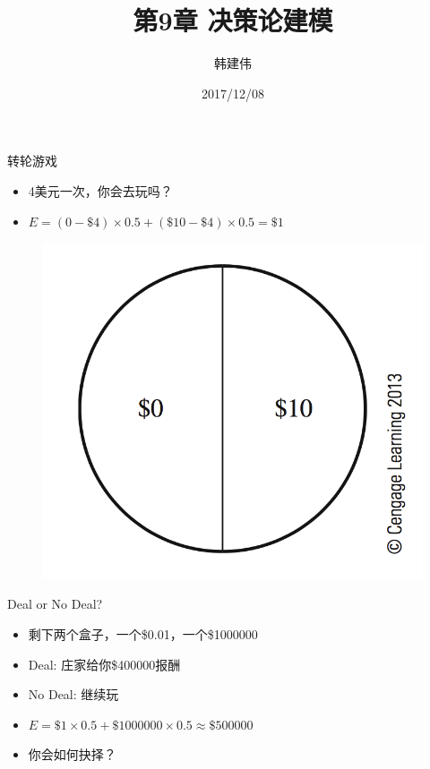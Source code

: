 \documentclass[UTF8]{ctexbeamer}
\title{第9章 决策论建模}
\author{韩建伟}
\institute{
  信息学院\\
  \texttt{mm@hanjianwei.com}
}
\date{2017/12/08}
\begin{document}
\begin{frame}[plain]
  \titlepage{}
\end{frame}

\begin{frame}{转轮游戏}

  \begin{itemize}
  \item<1-> 4美元一次，你会去玩吗？
  \item<2-> $E = (0-\$4) \times 0.5 + (\$10 - \$4) \times 0.5 = \$1$
  \end{itemize}

  \begin{figure}
    \centering
    \includegraphics[height=.4\textheight{}]{9_1.png}
  \end{figure}
  
\end{frame}

\begin{frame}{Deal or No Deal?}

  \begin{itemize}
  \item<1-> 剩下两个盒子，一个\$0.01，一个\$1000000
  \item<1-> Deal: 庄家给你\$400000报酬
  \item<1-> No Deal: 继续玩
  \item<2-> $E = \$1 \times 0.5 + \$1000000 \times 0.5 \approx \$500000$
  \item<3-> 你会如何抉择？
  \end{itemize}
  
\end{frame}
\end{document}
